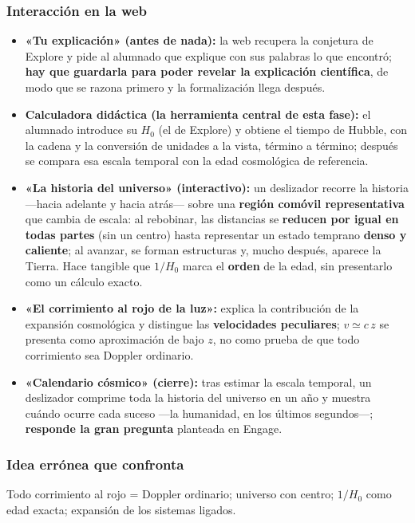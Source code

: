 \subsubsection*{Interacción en la web}

\begin{itemize}
\item \textbf{«Tu explicación» (antes de nada):} la web recupera la conjetura de Explore y pide al alumnado que explique con sus palabras lo que encontró; \textbf{hay que guardarla para poder revelar la explicación científica}, de modo que se razona primero y la formalización llega después.
\item \textbf{Calculadora didáctica (la herramienta central de esta fase):} el alumnado introduce su $H_{0}$ (el de Explore) y obtiene el tiempo de Hubble, con la cadena y la conversión de unidades a la vista, término a término; después se compara esa escala temporal con la edad cosmológica de referencia.
\item \textbf{«La historia del universo» (interactivo):} un deslizador recorre la historia ---hacia adelante y hacia atrás--- sobre una \textbf{región comóvil representativa} que cambia de escala: al rebobinar, las distancias se \textbf{reducen por igual en todas partes} (sin un centro) hasta representar un estado temprano \textbf{denso y caliente}; al avanzar, se forman estructuras y, mucho después, aparece la Tierra. Hace tangible que $1/H_{0}$ marca el \textbf{orden} de la edad, sin presentarlo como un cálculo exacto.
\item \textbf{«El corrimiento al rojo de la luz»:} explica la contribución de la expansión cosmológica y distingue las \textbf{velocidades peculiares}; $v\simeq c\,z$ se presenta como aproximación de bajo $z$, no como prueba de que todo corrimiento sea Doppler ordinario.
\item \textbf{«Calendario cósmico» (cierre):} tras estimar la escala temporal, un deslizador comprime toda la historia del universo en un año y muestra cuándo ocurre cada suceso ---la humanidad, en los últimos segundos---; \textbf{responde la gran pregunta} planteada en Engage.
\end{itemize}

\subsubsection*{Idea errónea que confronta}

Todo corrimiento al rojo = Doppler ordinario; universo con centro; $1/H_0$ como edad exacta; expansión de los sistemas ligados.

